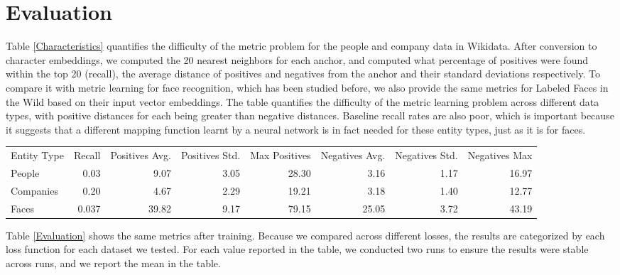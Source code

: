 \section{Evaluation}
\label{results}

Table \ref{Characteristics} quantifies the difficulty of the metric problem for the people and company data in Wikidata.  After conversion to character embeddings, we computed the 20 nearest neighbors for each anchor, and computed what percentage of positives were found within the top 20 (recall), the average distance of positives and negatives from the anchor and their standard deviations respectively.  To compare it with metric learning for face recognition, which has been studied before, we also provide the same metrics for Labeled Faces in the Wild based on their input vector embeddings.  The table quantifies the difficulty of the metric learning problem across different data types, with positive distances for each being greater than negative distances.  Baseline recall rates are also poor, which is important because it suggests that a different mapping function learnt by a neural network is in fact needed for these entity types, just as it is for faces.

\begin{table*}[ht]
\caption{Dataset characteristics}
\label{Characteristics}
\begin{tabular}{l|r|r|r|r|r|r|r|}
\hline
Entity Type & Recall & Positives Avg. & Positives Std. & Max Positives & Negatives Avg. & Negatives Std. & Negatives Max \\
People & 0.03 & 9.07 & 3.05 & 28.30 & 3.16 & 1.17 & 16.97 \\
Companies & 0.20 & 4.67 & 2.29 & 19.21 & 3.18 & 1.40 & 12.77 \\
Faces & 0.037 & 39.82 & 9.17 & 79.15 & 25.05 & 3.72 & 43.19 \\
\end{tabular}
\end{table*}

Table \ref{Evaluation} shows the same metrics after training.  Because we compared across different losses, the results are categorized by each loss function for each dataset we tested.  For each value reported in the table, we conducted two runs to ensure the results were stable across runs, and we report the mean in the table.

